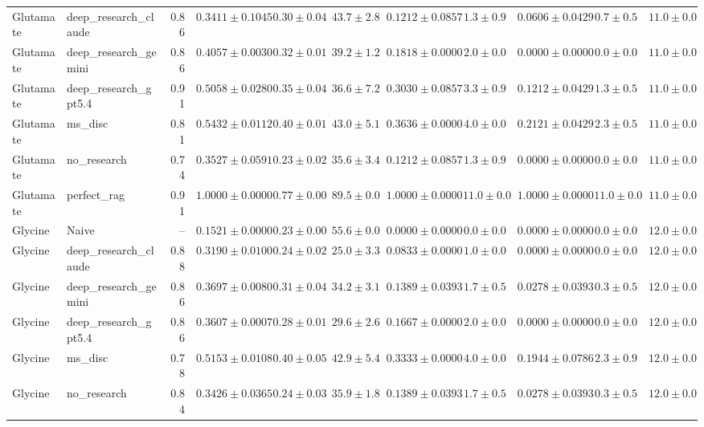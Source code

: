 \begin{table}[htbp]
\begin{tabular}{llrrrrrrrrr}
Glutamate & deep_research_claude & 0.86 & \cellcolor{red!25}$0.3411 \pm 0.1045$ & $0.30 \pm 0.04$ & $43.7 \pm 2.8$ & $0.1212 \pm 0.0857$ & $1.3 \pm 0.9$ & $0.0606 \pm 0.0429$ & $0.7 \pm 0.5$ & $11.0 \pm 0.0$ \\
Glutamate & deep_research_gemini & 0.86 & $0.4057 \pm 0.0030$ & $0.32 \pm 0.01$ & $39.2 \pm 1.2$ & $0.1818 \pm 0.0000$ & $2.0 \pm 0.0$ & $0.0000 \pm 0.0000$ & $0.0 \pm 0.0$ & $11.0 \pm 0.0$ \\
Glutamate & deep_research_gpt5.4 & 0.91 & $0.5058 \pm 0.0280$ & $0.35 \pm 0.04$ & $36.6 \pm 7.2$ & $0.3030 \pm 0.0857$ & $3.3 \pm 0.9$ & $0.1212 \pm 0.0429$ & $1.3 \pm 0.5$ & $11.0 \pm 0.0$ \\
Glutamate & ms_disc & 0.81 & $0.5432 \pm 0.0112$ & $0.40 \pm 0.01$ & $43.0 \pm 5.1$ & $0.3636 \pm 0.0000$ & $4.0 \pm 0.0$ & $0.2121 \pm 0.0429$ & $2.3 \pm 0.5$ & $11.0 \pm 0.0$ \\
Glutamate & no_research & 0.74 & $0.3527 \pm 0.0591$ & $0.23 \pm 0.02$ & $35.6 \pm 3.4$ & $0.1212 \pm 0.0857$ & $1.3 \pm 0.9$ & $0.0000 \pm 0.0000$ & $0.0 \pm 0.0$ & $11.0 \pm 0.0$ \\
Glutamate & perfect_rag & 0.91 & \cellcolor{green!25}$1.0000 \pm 0.0000$ & $0.77 \pm 0.00$ & $89.5 \pm 0.0$ & $1.0000 \pm 0.0000$ & $11.0 \pm 0.0$ & $1.0000 \pm 0.0000$ & $11.0 \pm 0.0$ & $11.0 \pm 0.0$ \\
\midrule
Glycine & Naive & -- & \cellcolor{red!25}$0.1521 \pm 0.0000$ & $0.23 \pm 0.00$ & $55.6 \pm 0.0$ & $0.0000 \pm 0.0000$ & $0.0 \pm 0.0$ & $0.0000 \pm 0.0000$ & $0.0 \pm 0.0$ & $12.0 \pm 0.0$ \\
Glycine & deep_research_claude & 0.88 & $0.3190 \pm 0.0100$ & $0.24 \pm 0.02$ & $25.0 \pm 3.3$ & $0.0833 \pm 0.0000$ & $1.0 \pm 0.0$ & $0.0000 \pm 0.0000$ & $0.0 \pm 0.0$ & $12.0 \pm 0.0$ \\
Glycine & deep_research_gemini & 0.86 & $0.3697 \pm 0.0080$ & $0.31 \pm 0.04$ & $34.2 \pm 3.1$ & $0.1389 \pm 0.0393$ & $1.7 \pm 0.5$ & $0.0278 \pm 0.0393$ & $0.3 \pm 0.5$ & $12.0 \pm 0.0$ \\
Glycine & deep_research_gpt5.4 & 0.86 & $0.3607 \pm 0.0007$ & $0.28 \pm 0.01$ & $29.6 \pm 2.6$ & $0.1667 \pm 0.0000$ & $2.0 \pm 0.0$ & $0.0000 \pm 0.0000$ & $0.0 \pm 0.0$ & $12.0 \pm 0.0$ \\
Glycine & ms_disc & 0.78 & $0.5153 \pm 0.0108$ & $0.40 \pm 0.05$ & $42.9 \pm 5.4$ & $0.3333 \pm 0.0000$ & $4.0 \pm 0.0$ & $0.1944 \pm 0.0786$ & $2.3 \pm 0.9$ & $12.0 \pm 0.0$ \\
Glycine & no_research & 0.84 & $0.3426 \pm 0.0365$ & $0.24 \pm 0.03$ & $35.9 \pm 1.8$ & $0.1389 \pm 0.0393$ & $1.7 \pm 0.5$ & $0.0278 \pm 0.0393$ & $0.3 \pm 0.5$ & $12.0 \pm 0.0$ \\

\end{tabular}
\end{table}
